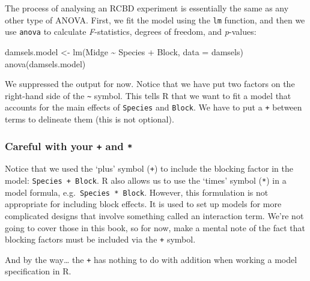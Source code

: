 \documentclass[
]{book}
\newenvironment{Shaded}{\begin{snugshade}}{\end{snugshade}}
\newcommand{\AttributeTok}[1]{\textcolor[rgb]{0.77,0.63,0.00}{#1}}
\newcommand{\FunctionTok}[1]{\textcolor[rgb]{0.00,0.00,0.00}{#1}}
\newcommand{\NormalTok}[1]{#1}
\newcommand{\OtherTok}[1]{\textcolor[rgb]{0.56,0.35,0.01}{#1}}
\newcommand{\SpecialCharTok}[1]{\textcolor[rgb]{0.00,0.00,0.00}{#1}}
\newenvironment{greybox}{
  \definecolor{shadecolor}{rgb}{0.95,0.95,0.95}  %
  \color{black}
  \begin{shaded}}
 {\end{shaded}}
\newenvironment{infobox}[1]
  {
  \begin{itemize}
  \renewcommand{\labelitemi}{
    \raisebox{-.7\height}[0pt][0pt]{
      {\setkeys{Gin}{width=3em,keepaspectratio}
        \texttt{[image: images/\#1]}}
    }
  }
  \setlength{\fboxsep}{1em}
  \begin{greybox}
  \item
  }
  {
  \end{greybox}
  \end{itemize}
  }
\begin{document}
The process of analysing an RCBD experiment is essentially the same as any other type of ANOVA. First, we fit the model using the \texttt{lm} function, and then we use \texttt{anova} to calculate \emph{F}-statistics, degrees of freedom, and \emph{p}-values:

\begin{Shaded}
\begin{Highlighting}[]
\NormalTok{damsels.model }\OtherTok{\textless{}{-}} \FunctionTok{lm}\NormalTok{(Midge }\SpecialCharTok{\textasciitilde{}}\NormalTok{ Species }\SpecialCharTok{+}\NormalTok{ Block, }\AttributeTok{data =}\NormalTok{ damsels)}
\FunctionTok{anova}\NormalTok{(damsels.model)}
\end{Highlighting}
\end{Shaded}

We suppressed the output for now. Notice that we have put two factors on the right-hand side of the \texttt{\textasciitilde{}} symbol. This tells R that we want to fit a model that accounts for the main effects of \texttt{Species} and \texttt{Block}. We have to put a \texttt{+} between terms to delineate them (this is not optional).

\begin{infobox}{warning}

\hypertarget{careful-with-your-and}{%
\subsubsection*{\texorpdfstring{Careful with your \texttt{+} and \texttt{*}}{Careful with your + and *}}\label{careful-with-your-and}}

Notice that we used the `plus' symbol (\texttt{+}) to include the blocking factor in the model: \texttt{Species\ +\ Block}. R also allows us to use the `times' symbol (\texttt{*}) in a model formula, e.g.~\texttt{Species\ *\ Block}. However, this formulation is not appropriate for including block effects. It is used to set up models for more complicated designs that involve something called an interaction term. We're not going to cover those in this book, so for now, make a mental note of the fact that blocking factors must be included via the \texttt{+} symbol.

And by the way\ldots{} the \texttt{+} has nothing to do with addition when working a model specification in R.

\end{infobox}
\end{document}
